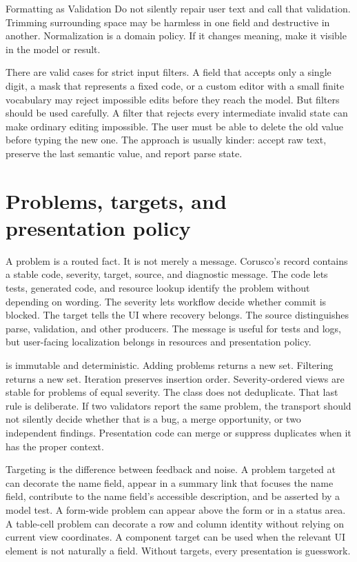 \begin{pitfallbox}{Formatting as Validation}
Do not silently repair user text and call that validation. Trimming surrounding
space may be harmless in one field and destructive in another. Normalization is
a domain policy. If it changes meaning, make it visible in the model or result.
\end{pitfallbox}

There are valid cases for strict input filters. A field that accepts only a
single digit, a mask that represents a fixed code, or a custom editor with a
small finite vocabulary may reject impossible edits before they reach the
model. But filters should be used carefully. A filter that rejects every
intermediate invalid state can make ordinary editing impossible. The user must
be able to delete the old value before typing the new one. The
 approach is usually kinder: accept raw text, preserve the
last semantic value, and report parse state.

\section{Problems, targets, and presentation policy}

A problem is a routed fact. It is not merely a message. Corusco's
 record contains a stable code, severity, target, source, and
diagnostic message. The code lets tests, generated code, and resource lookup
identify the problem without depending on wording. The severity lets workflow
decide whether commit is blocked. The target tells the UI where recovery
belongs. The source distinguishes parse, validation, and other producers. The
message is useful for tests and logs, but user-facing localization belongs in
resources and presentation policy.

 is immutable and deterministic. Adding problems returns a new
set. Filtering returns a new set. Iteration preserves insertion order.
Severity-ordered views are stable for problems of equal severity. The class
does not deduplicate. That last rule is deliberate. If two validators report
the same problem, the transport should not silently decide whether that is a
bug, a merge opportunity, or two independent findings. Presentation code can
merge or suppress duplicates when it has the proper context.

Targeting is the difference between feedback and noise. A problem targeted at
 can decorate the name field,
appear in a summary link that focuses the name field, contribute to the name
field's accessible description, and be asserted by a model test. A form-wide
problem can appear above the form or in a status area. A table-cell problem can
decorate a row and column identity without relying on current view coordinates.
A component target can be used when the relevant UI element is not naturally a
field. Without targets, every presentation is guesswork.

